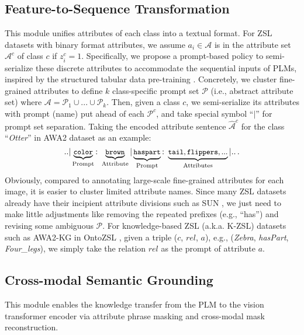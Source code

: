 \documentclass[letterpaper]{article} \usepackage{aaai23}  \usepackage{times}  \usepackage{helvet}  \usepackage{courier}  \usepackage[hyphens]{url}  \usepackage{graphicx} \urlstyle{rm} \def\UrlFont{\rm}  \usepackage{natbib}  \usepackage{caption} \frenchspacing  \setlength{\pdfpagewidth}{8.5in}  \setlength{\pdfpageheight}{11in}  \usepackage{algorithm}
\newcommand{\wen}[1]{{\color{black}#1}}
\newcommand{\fy}[1]{{\color{black}#1}}
\begin{document}
\subsection{Feature-to-Sequence Transformation} \label{sec:FST}
\wen{This module unifies attributes of each class into a textual format. }
For ZSL datasets with binary format attributes,  we assume $a_{i} \in \mathcal{A}$ is in the attribute set $\mathcal{A}^c$ of class $c$ if $z_{i}^{c} = 1$.  
Specifically, 
we propose a prompt-based policy  to semi-serialize these discrete attributes \fy{to accommodate} the sequential input\fy{s} of PLMs, \wen{inspired by the structured tabular data pre-training \cite{DBLP:conf/acl/YinNYR20}}.
Concretely, we  cluster fine-grained attributes to define  
\wen{$k$}
class-specific prompt  set $\mathcal{P}$ (i.e., abstract attribute set)  where $\mathcal{A}=\mathcal{P}_1\cup...\cup\mathcal{P}_{k}$.
Then, 
\wen{given a class $c$,}
we semi-serialize its attributes
with prompt (name) put ahead of each $\mathcal{P}^c$, and take special symbol ``$|$'' for prompt set separation.
Taking the encoded  attribute sentence {$\widehat{\mathcal{A}}^c$} for the class ``\textit{Otter}'' in AWA2 \cite{DBLP:journals/pami/XianLSA19} dataset as an example:
\begin{equation}
\small
	{\tt{..}} {\tt|} \underbrace{{\tt{color}}}_{\textrm{Prompt}} {\tt:}~  \underbrace{{\tt{brown}}}_{\textrm{Attribute}} {\tt|}  \underbrace{{\tt{has part}}}_{\textrm{Prompt}} {\tt:}~ \underbrace{{\tt{tail, flippers, ...}}}_{\textrm{Attributes}} {\tt|}	{\tt{..}}\, .
\end{equation}
Obviously, compared to annotating large-scale fine-grained attributes for each image, it is \fy{easier} to cluster limited attribute names.
Since many ZSL datasets already have their incipient attribute divisions such as SUN \cite{DBLP:conf/cvpr/PattersonH12}, we just need to make little adjustments like removing the repeated prefixes (e.g., ``has'') and revising some ambiguous $\mathcal{P}$.
For knowledge-based ZSL (a.k.a. K-ZSL) datasets  such as AWA2-KG in OntoZSL \cite{DBLP:conf/www/GengC0PYYJC21}, given a triple
\wen{($c$, $rel$, $a$), e.g., (\textit{Zebra}, \textit{hasPart}, \textit{Four_legs})}, 
we simply take the relation $rel$ as the prompt of attribute $a$. 
\subsection{Cross-modal Semantic Grounding} \label{sec:CSG}
\wen{This module enables the knowledge transfer from the PLM to the vision transformer encoder via attribute phrase masking and cross-modal mask reconstruction.}
\end{document}
